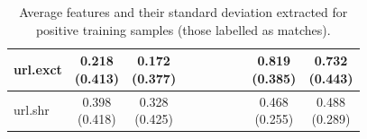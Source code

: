 \documentclass[epsfig,a4paper,11pt,titlepage,twoside,openany]{book}
\begin{document}
\begin{table}[h]
\begin{tabular}{l|c|c|c|c|c|c|c|c|c|}
\multicolumn{1}{|l|}{url.exct}                           & \makecell{0.218 \\ (0.413)}  & \makecell{0.172 \\ (0.377)} &              &              &              &              &              & \makecell{0.819 \\ (0.385)}    & \makecell{0.732 \\ (0.443)}   \\ \hline
\multicolumn{1}{|l|}{url.shr}                  & \makecell{0.398 \\ (0.418)}  & \makecell{0.328 \\ (0.425)} &              &              &              &              &              & \makecell{0.468 \\ (0.255)}    & \makecell{0.488 \\ (0.289)}   \\ \hline
\end{tabular}
\caption{Average features and their standard deviation extracted for positive training samples (those labelled as matches).}
\label{tab:features-viz-average-std-positive}
\end{table}
\end{document}
